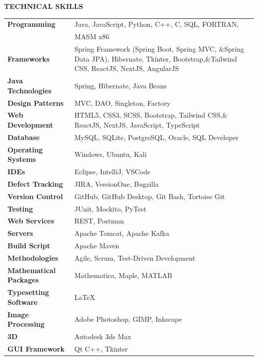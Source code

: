 \documentclass[a4paper, 12pt]{article}
\begin{document}
\newpage
\begin{flushleft}
\faCogs\quad\textbf{TECHNICAL SKILLS}
\begin{table}[h!]
    \centering
    \begin{tabular}{ll}
        \textbf{Programming}        & Java, JavaScript, Python, C++, C, SQL, FORTRAN, \\&MASM x86 \\
    \textbf{Frameworks}                   & Spring Framework (Spring Boot, Spring MVC, \&Spring Data JPA), Hibernate, Tkinter, Bootstrap,\&Tailwind CSS, ReactJS, NextJS, AngularJS \\
    \textbf{Java Technologies}            & Spring, Hibernate, Java Beans \\
    \textbf{Design Patterns}              & MVC, DAO, Singleton, Factory \\
    \textbf{Web Development}              & HTML5, CSS3, SCSS, Bootstrap, Tailwind CSS,\& ReactJS, NextJS, JavaScript, TypeScript \\
    \textbf{Database}                     & MySQL, SQLite, PostgreSQL, Oracle, SQL Developer \\
    \textbf{Operating Systems}            & Windows, Ubuntu, Kali \\
    \textbf{IDEs}                         & Eclipse, IntelliJ, VSCode \\
    \textbf{Defect Tracking}              & JIRA, VersionOne, Bugzilla \\
    \textbf{Version Control}              & GitHub, GitHub Desktop, Git Bash, Tortoise Git \\
    \textbf{Testing}                      & JUnit, Mockito, PyTest \\
    \textbf{Web Services}                 & REST, Postman \\
    \textbf{Servers}                      & Apache Tomcat, Apache Kafka \\
    \textbf{Build Script}                 & Apache Maven \\
    \textbf{Methodologies}                & Agile, Scrum, Test-Driven Development \\
    \textbf{Mathematical Packages}        & Mathematica, Maple, MATLAB \\
    \textbf{Typesetting Software}         & \LaTeX \\
    \textbf{Image Processing}    & Adobe Photoshop, GIMP, Inkscape \\
    \textbf{3D}   & Autodesk 3ds Max \\
    \textbf{GUI Framework}                & Qt C++, Tkinter
    \end{tabular}
\end{table}

\end{flushleft}
\end{document}
